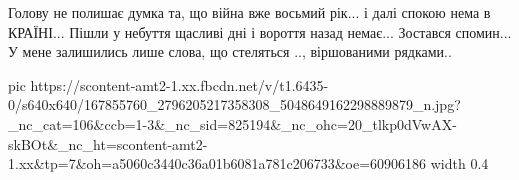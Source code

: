  
 
 
 
 

Голову не полишає думка та,
що війна вже восьмий рік...
і далі спокою нема в КРАЇНІ...
Пішли у небуття щасливі дні
і вороття назад немає...
Зостався спомин...
У мене залишились лише слова,
що стеляться ..,
віршованими рядками..


\ifcmt
  pic https://scontent-amt2-1.xx.fbcdn.net/v/t1.6435-0/s640x640/167855760_2796205217358308_5048649162298889879_n.jpg?_nc_cat=106&ccb=1-3&_nc_sid=825194&_nc_ohc=20_tlkp0dVwAX-skBOt&_nc_ht=scontent-amt2-1.xx&tp=7&oh=a5060c3440c36a01b6081a781c206733&oe=60906186
  width 0.4
\fi

